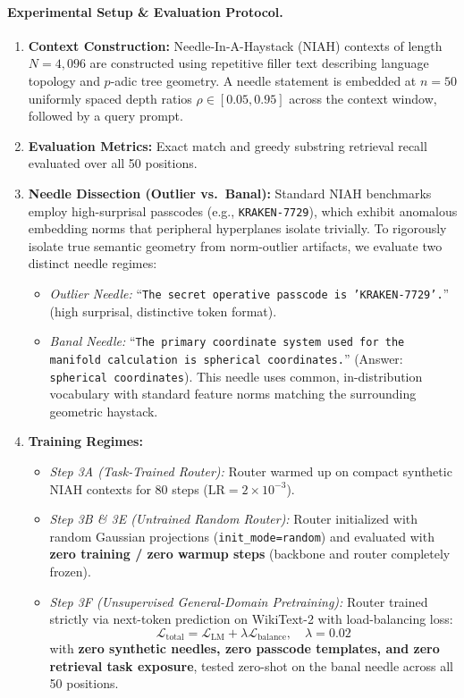 \documentclass[11pt,a4paper]{article}
\begin{document}
\paragraph{Experimental Setup \& Evaluation Protocol.}
\begin{enumerate}
    \item \textbf{Context Construction:} Needle-In-A-Haystack (NIAH) contexts of length $N = 4{,}096$ are constructed using repetitive filler text describing language topology and $p$-adic tree geometry. A needle statement is embedded at $n = 50$ uniformly spaced depth ratios $\rho \in [0.05, 0.95]$ across the context window, followed by a query prompt.
    \item \textbf{Evaluation Metrics:} Exact match and greedy substring retrieval recall evaluated over all 50 positions.
    \item \textbf{Needle Dissection (Outlier vs.\ Banal):} Standard NIAH benchmarks employ high-surprisal passcodes (e.g., \texttt{KRAKEN-7729}), which exhibit anomalous embedding norms that peripheral hyperplanes isolate trivially. To rigorously isolate true semantic geometry from norm-outlier artifacts, we evaluate two distinct needle regimes:
    \begin{itemize}
        \item \emph{Outlier Needle:} ``\texttt{The secret operative passcode is 'KRAKEN-7729'.}'' (high surprisal, distinctive token format).
        \item \emph{Banal Needle:} ``\texttt{The primary coordinate system used for the manifold calculation is spherical coordinates.}'' (Answer: \texttt{spherical coordinates}). This needle uses common, in-distribution vocabulary with standard feature norms matching the surrounding geometric haystack.
    \end{itemize}
    \item \textbf{Training Regimes:}
    \begin{itemize}
        \item \emph{Step 3A (Task-Trained Router):} Router warmed up on compact synthetic NIAH contexts for 80 steps ($\text{LR} = 2 \times 10^{-3}$).
        \item \emph{Step 3B \& 3E (Untrained Random Router):} Router initialized with random Gaussian projections (\texttt{init\_mode=random}) and evaluated with \textbf{zero training / zero warmup steps} (backbone and router completely frozen).
        \item \emph{Step 3F (Unsupervised General-Domain Pretraining):} Router trained strictly via next-token prediction on WikiText-2 with load-balancing loss:
        \begin{equation}
            \mathcal{L}_{\text{total}} = \mathcal{L}_{\text{LM}} + \lambda \mathcal{L}_{\text{balance}}, \quad \lambda = 0.02
        \end{equation}
        with \textbf{zero synthetic needles, zero passcode templates, and zero retrieval task exposure}, tested zero-shot on the banal needle across all 50 positions.
    \end{itemize}
\end{enumerate}
\end{document}
